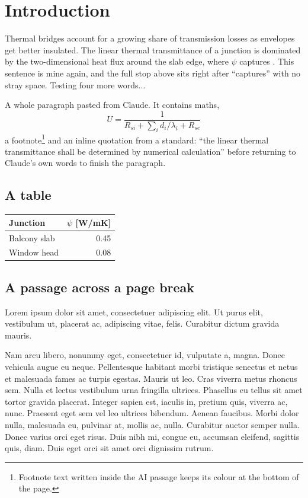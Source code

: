 \documentclass[11pt]{article}
\begin{document}
\section{Introduction}

Thermal bridges account for a growing share of transmission losses as envelopes get better insulated.
The linear thermal transmittance of a junction is
dominated by the two-dimensional heat flux around the slab edge, where $\psi$ captures%
.
This sentence is mine again, and the full stop above sits right after ``captures'' with no stray space.
Testing four more words...

A whole paragraph pasted from Claude.
It contains maths,
\begin{equation}
  U = \frac{1}{R_{si} + \sum_i d_i/\lambda_i + R_{se}}
\end{equation}
a footnote\footnote{Footnote text written inside the AI passage keeps its colour at the bottom of the page.} and an
inline quotation from a standard:
``the linear thermal transmittance shall be determined by numerical calculation''
before returning to Claude's own words to finish the paragraph.

\subsection{A table}

\begin{tabular}{lr}
  \hline
  Junction & $\psi$ [W/mK] \\
  \hline
  Balcony slab & 0.45 \\
  Window head  & 0.08 \\
  \hline
\end{tabular}

\subsection{A passage across a page break}

Lorem ipsum dolor sit amet, consectetuer adipiscing elit. Ut purus elit, vestibulum ut, placerat ac, adipiscing vitae, felis.
Curabitur dictum gravida mauris.

Nam arcu libero, nonummy eget, consectetuer id, vulputate a, magna.
Donec vehicula augue eu neque. Pellentesque habitant morbi tristique senectus et netus et malesuada fames ac turpis egestas.
Mauris ut leo.
Cras viverra metus rhoncus sem.
Nulla et lectus vestibulum urna fringilla ultrices.
Phasellus eu tellus sit amet tortor gravida placerat.
Integer sapien est, iaculis in, pretium quis, viverra ac, nunc.
Praesent eget sem vel leo ultrices bibendum.
Aenean faucibus.
Morbi dolor nulla, malesuada eu, pulvinar at, mollis ac, nulla.
Curabitur auctor semper nulla. Donec varius orci eget risus.
Duis nibh mi, congue eu, accumsan eleifend, sagittis quis, diam.
Duis eget orci sit amet orci dignissim rutrum.
\end{document}
